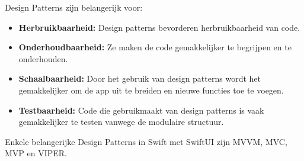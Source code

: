 Design Patterns zijn belangerijk voor:
\begin{itemize}
    \item {\textbf{Herbruikbaarheid:} Design patterns bevorderen herbruikbaarheid van code.}
    \item {\textbf{Onderhoudbaarheid:} Ze maken de code gemakkelijker te begrijpen en te onderhouden.}
    \item {\textbf{Schaalbaarheid:} Door het gebruik van design patterns wordt het gemakkelijker om de app uit te breiden en nieuwe functies toe te voegen.}
    \item {\textbf{Testbaarheid:} Code die gebruikmaakt van design patterns is vaak gemakkelijker te testen vanwege de modulaire structuur.}
\end{itemize}
\autocite{MediumPatterns} Enkele belangerijke Design Patterns in Swift met SwiftUI zijn MVVM, MVC, MVP en VIPER.

